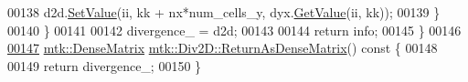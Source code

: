 \begin{DoxyCode}
00138       d2d.\hyperlink{classmtk_1_1DenseMatrix_a784ce5784109ac86bfb9d8562b334b13}{SetValue}(ii, kk + nx*num\_cells\_y, dyx.\hyperlink{classmtk_1_1DenseMatrix_a4b23ecbebd970b5eea915dbb50691024}{GetValue}(ii, kk));
00139     \}
00140   \}
00141 
00142   divergence\_ = d2d;
00143 
00144   \textcolor{keywordflow}{return} info;
00145 \}
00146 
\hypertarget{mtk__div__2d_8cc_source_l00147}{}\hyperlink{classmtk_1_1Div2D_ae4f880fb28ad2379906e9ac0dfaa4458}{00147} \hyperlink{classmtk_1_1DenseMatrix}{mtk::DenseMatrix} \hyperlink{classmtk_1_1Div2D_ae4f880fb28ad2379906e9ac0dfaa4458}{mtk::Div2D::ReturnAsDenseMatrix}()\textcolor{keyword}{ const }\{
00148 
00149   \textcolor{keywordflow}{return} divergence\_;
00150 \}
\end{DoxyCode}
